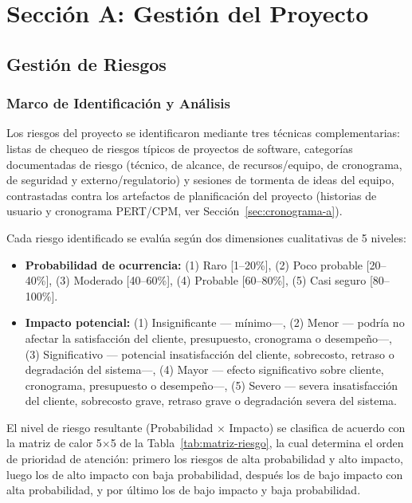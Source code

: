 \chapter{Sección A: Gestión del Proyecto}

\section{Gestión de Riesgos}

\subsection{Marco de Identificación y Análisis}

Los riesgos del proyecto se identificaron mediante tres técnicas complementarias: listas de chequeo de riesgos típicos de proyectos de software, categorías documentadas de riesgo (técnico, de alcance, de recursos/equipo, de cronograma, de seguridad y externo/regulatorio) y sesiones de tormenta de ideas del equipo, contrastadas contra los artefactos de planificación del proyecto (historias de usuario y cronograma PERT/CPM, ver Sección~\ref{sec:cronograma-a}).

Cada riesgo identificado se evalúa según dos dimensiones cualitativas de 5 niveles:

\begin{itemize}[leftmargin=*]
    \item \textbf{Probabilidad de ocurrencia:} (1) Raro [1--20\%], (2) Poco probable [20--40\%], (3) Moderado [40--60\%], (4) Probable [60--80\%], (5) Casi seguro [80--100\%].
    \item \textbf{Impacto potencial:} (1) Insignificante --- mínimo---, (2) Menor --- podría no afectar la satisfacción del cliente, presupuesto, cronograma o desempeño---, (3) Significativo --- potencial insatisfacción del cliente, sobrecosto, retraso o degradación del sistema---, (4) Mayor --- efecto significativo sobre cliente, cronograma, presupuesto o desempeño---, (5) Severo --- severa insatisfacción del cliente, sobrecosto grave, retraso grave o degradación severa del sistema.
\end{itemize}

El nivel de riesgo resultante (Probabilidad $\times$ Impacto) se clasifica de acuerdo con la matriz de calor 5$\times$5 de la Tabla~\ref{tab:matriz-riesgo}, la cual determina el orden de prioridad de atención: primero los riesgos de alta probabilidad y alto impacto, luego los de alto impacto con baja probabilidad, después los de bajo impacto con alta probabilidad, y por último los de bajo impacto y baja probabilidad.

